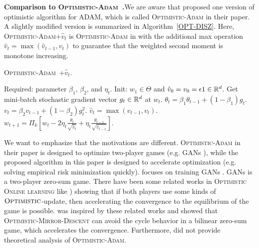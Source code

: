 \documentclass[11pt]{article}
\theoremstyle{k}
\begin{document}
\textbf{Comparison to \textsc{Optimistic-Adam}~\citep{DISZ18}.}\hspace{0.1in}We are aware that \citep{DISZ18} proposed one version of optimistic algorithm for ADAM, which
is called \textsc{Optimistic-Adam} in their paper. A slightly modified version is summarized in Algorithm~\ref{OPT-DISZ}. Here, \textsc{Optimistic-Adam$+\hat{v}_t$} is \textsc{Optimistic-Adam} in \citep{DISZ18} with the additional max operation $\hat{v}_t = \max ( \hat{v}_{t-1}, v_t)$ to guarantee that the weighted second moment is monotone increasing.

\begin{algorithm}[h]
\begin{algorithmic}[1]
\caption{\textsc{Optimistic-Adam~\citep{DISZ18}+$\hat{v}_t$}. \label{OPT-DISZ}}
\STATE Required: parameter $\beta_1$, $\beta_2$, and $\eta_t$.
\STATE Init: $w_1 \in \Theta$ and $\hat{v}_0 = v_{0} = \epsilon 1 \in \mathbb{R}^{d}$.
\STATE Get mini-batch stochastic gradient vector $g_t \in \mathbb{R}^d$ at $w_t$.
\STATE $\theta_t = \beta_{1} \theta_{t-1} + (1 - \beta_{1}) g_t$.
\STATE $v_t = \beta_2 v_{t-1} + (1 - \beta_2) g_t^2$.
\STATE $\hat{v}_t = \max( \hat{v}_{t-1} , v_t )$.
\STATE $w_{t+1} = \Pi_{k}[ w_{t} - 2 \eta_t \frac{\theta_t}{ \sqrt{\hat{v}_t }}
+ \eta_t \frac{\theta_{t-1}}{ \sqrt{\hat{v}_{t-1}} }]$.
\ENDFOR
\end{algorithmic}
\end{algorithm}

We want to emphasize that the motivations are different. \textsc{Optimistic-Adam} in their paper is designed to optimize two-player games (e.g. GANs \citep{goodfellow2014generative}),
while the proposed algorithm in this paper is designed to accelerate optimization
(e.g. solving empirical risk minimization quickly).
\citep{DISZ18} focuses on training GANs \citep{goodfellow2014generative}. GANs is a two-player zero-sum game. There have been some related works in \textsc{Optimistic Online learning} like \citep{CJ12,RS13b,SALS15})
showing that if both players use some kinds of $\textsc{Optimistic}$-update,
then accelerating the convergence to the equilibrium of the game is possible.
\citep{DISZ18} was inspired by these related works and showed that \textsc{Optimistic-Mirror-Descent}
can avoid the cycle behavior in a bilinear zero-sum game, which accelerates the convergence. Furthermore, \citep{DISZ18} did not provide theoretical analysis of \textsc{Optimistic-Adam}.
\end{document}
